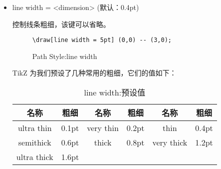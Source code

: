 \begin{itemize}
    \item line width = <dimension> \hfill (默认：0.4pt)
    
    控制线条粗细，该键可以省略。

    \begin{figure}[H]
        \centering
        \begin{minipage}{0.35\linewidth}
            \centering
        \end{minipage}
        \begin{minipage}{0.55\linewidth}
            \begin{lstlisting}[style = latex-side]
    \draw[line width = 5pt] (0,0) -- (3,0);
            \end{lstlisting}
        \end{minipage}
        \caption{Path Style:line width}
    \end{figure}

    TikZ 为我们预设了几种常用的粗细，它们的值如下：

    \begin{table}[H]
        \centering
        \caption{line width:预设值}
        \label{table:line width:预设值}
        \setlength{\tabcolsep}{5mm}
        \begin{tabular}{cc|cc|cc}
            \toprule
            \textbf{名称} & \textbf{粗细} & \textbf{名称} & \textbf{粗细} & \textbf{名称} & \textbf{粗细} \\
            \midrule
            ultra thin  & 0.1pt  & very thin & 0.2pt & thin & 0.4pt \\
            semithick   & 0.6pt  & thick     & 0.8pt & very thick & 1.2pt \\
            ultra thick   & 1.6pt  &&&& \\
            \bottomrule
        \end{tabular}
    \end{table}


\end{itemize}
